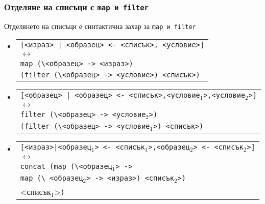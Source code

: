 \documentclass{beamer}
\begin{document}
\begin{frame}
  \frametitle{Отделяне на списъци с \tt{map} и \tt{filter}}
  Отделянето на списъци е синтактична захар за \tt{map} и \tt{filter}\pause
  \small
  \begin{itemize}[<+->]
  \item \begin{tabular}[t]{l}
      \tt[<израз> \tt| <образец> \tt{<-} <списък>\tt, <условие>\tt]\\
      $\longleftrightarrow$\\
      \tt{map (\textbackslash}<образец> \tt{->} <израз>\tt)\\
      \hspace{5ex}\tt{(filter (\textbackslash}<образец> \tt{->} <условие>\tt) <списък>\tt)
    \end{tabular}
  \item \begin{tabular}[t]{l}
      \tt[<образец> \tt| <образец> \tt{<-} <списък>\tt,<условие$_1$>,<условие$_2$>\tt]\\
      $\longleftrightarrow$\\
      \tt{filter (\textbackslash}<образец> \tt{->} <условие$_2$>\tt)\\
      \hspace{5ex}\tt{(filter (\textbackslash}<образец> \tt{->} <условие$_1$>\tt) <списък>\tt)
    \end{tabular}
  \item \begin{tabular}[t]{l}
      \tt[<израз>\tt|<образец$_1$> \tt{<-} <списък$_1$>\tt,<образец$_2$> \tt{<-} <списък$_2$>\tt]\\
      $\longleftrightarrow$\\
      \tt{concat (map (\textbackslash}<образец$_1$> \tt{->}\\
      \hspace{15ex}\tt{map (\textbackslash} <образец$_2$> \tt{->} <израз>\tt) <списък$_2$>\tt)\\
      \hspace{10ex} <списък$_1$>\tt)
    \end{tabular}
  \end{itemize}
\end{frame}
\end{document}
